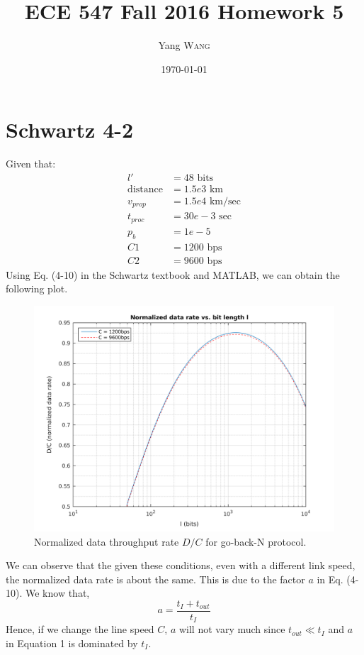 \documentclass{article}
\title{ECE 547 Fall 2016 Homework 5} %
\author{Yang \textsc{Wang}}  %
\date{\today} %
\begin{document}
\maketitle %


\section*{Schwartz 4-2}
	Given that:
	\begin{align*}
		l' &= 48 \text{ bits} \\
		\text{distance} &= 1.5e3 \text{ km} \\
		v_{prop} &= 1.5e4 \text{ km/sec} \\
		t_{proc} &= 30e-3 \text{ sec} \\
		p_b &= 1e-5 \\
		C1 &= 1200 \text{ bps} \\
		C2 &= 9600 \text{ bps}
	\end{align*}
	Using Eq. (4-10) in the Schwartz textbook and MATLAB, we can obtain the
	following plot.
	\begin{figure}[!hbt]
		\centering
		\includegraphics[width=0.6\linewidth]{hw5_1_dr.png}
		\caption{Normalized data throughput rate $D/C$ for go-back-N protocol.}
	\end{figure}
	We can observe that the given these conditions, even with a different link
	speed, the normalized data rate is about the same. This is due to the factor
	$a$ in Eq. (4-10). We know that,
	\begin{equation}
		a = \frac{t_I + t_{out}}{t_I}
	\end{equation}
	Hence, if we change the line speed $C$, $a$ will not vary much since
	$t_{out} \ll t_I$ and $a$ in Equation 1 is dominated by $t_I$.
\end{document}
